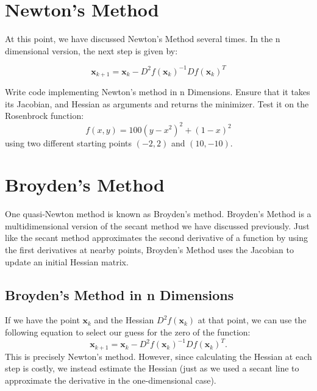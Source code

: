 

\section*{Newton's Method}
At this point, we have discussed Newton's Method several times. In the n dimensional version,
the next step is given by:

\begin{equation} \label{Eq:BasicNewton}
\mathbf{x}_{k+1} = \mathbf{x}_k - D^2f(\mathbf{x}_k)^{-1}Df(\mathbf{x}_k)^T
\end{equation}

\begin{problem}
Write code implementing Newton's method in n Dimensions. Ensure that it takes
its Jacobian, and Hessian as arguments and returns the
minimizer. Test it on the Rosenbrock function:
\[
f(x,y) = 100(y-x^2)^2 + (1-x)^2
\]
using two different starting points $(-2,2)$ and $(10,-10)$.
\end{problem}

\section*{Broyden's Method}
One quasi-Newton method is known as Broyden's method. Broyden's Method is a
multidimensional version of the secant method we have discussed previously.
Just like the secant method approximates the second derivative of a function by
using the first derivatives at nearby points, Broyden's Method uses
the Jacobian to update an initial Hessian matrix.

\subsection*{Broyden's Method in n Dimensions}

If we have the point $\mathbf{x}_k$ and the Hessian $D^2f(\mathbf{x}_k)$ at that point, we can use the
following equation to select our guess for the zero of the function:
\begin{equation} \label{Eq:BroydenSolve}
\mathbf{x}_{k+1} = \mathbf{x}_k-D^2f(\mathbf{x}_k)^{-1}Df(\mathbf{x}_k)^T.
\end{equation}
This is precisely Newton's method. However, since calculating the Hessian at each step is costly, we instead estimate the Hessian (just as we used a secant line to approximate the derivative in the one-dimensional case).

